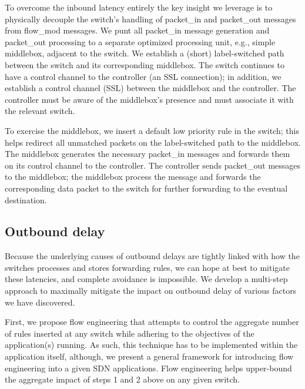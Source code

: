 To overcome the inbound latency entirely the key insight we leverage is to
physically decouple the switch's handling of packet\_in and packet\_out messages
from flow\_mod messages. We punt all packet\_in message generation and packet\_out
processing to a separate optimized processing unit, e.g., simple middlebox,
adjacent to the switch. We establish a (short) label-switched path between the
switch and its corresponding middlebox. The switch continues to have a control
channel to the controller (an SSL connection); in addition, we establish a
control channel (SSL) between the middlebox and the controller. The controller
must be aware of the middlebox's presence and must associate it with the
relevant switch. 

To exercise the middlebox, we insert a default low priority rule in the
switch; this helps redirect all unmatched packets on the label-switched path
to the middlebox. The middlebox generates the necessary
packet\_in messages and forwards them on its control channel to the
controller. The controller sends packet\_out messages to the middlebox; the
middlebox process the message and forwards the corresponding data packet to the
switch for further forwarding to the eventual destination. 

\subsection{Outbound delay}
Because
the underlying causes of outbound delays are tightly linked with how
the switches processes and stores forwarding rules, we can hope at
best to mitigate these latencies, and complete avoidance is
impossible. We develop a multi-step approach to maximally mitigate the impact on
outbound delay of various factors we have discovered.

First, we propose flow engineering that attempts to control the aggregate number
of rules inserted at any switch while adhering to the objectives of the
application(s) running. As such, this technique has to be implemented within the
application itself, although, we present a general framework for introducing
flow engineering into a given SDN applications. Flow engineering helps
upper-bound the aggregate impact of steps 1 and 2 above on any given switch. 

